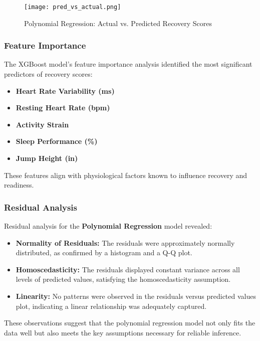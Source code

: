 \documentclass[manuscript,acmsmall,review,screen,authorversion=true]{acmart}
\begin{document}
\begin{figure}[h]
\centering
\texttt{[image: pred\_vs\_actual.png]} %
\caption{Polynomial Regression: Actual vs. Predicted Recovery Scores}
\label{fig:pred_vs_actual}
\end{figure}

\subsubsection{Feature Importance}

The XGBoost model's feature importance analysis identified the most significant predictors of recovery scores:

\begin{itemize}
    \item \textbf{Heart Rate Variability (ms)}
    \item \textbf{Resting Heart Rate (bpm)}
    \item \textbf{Activity Strain}
    \item \textbf{Sleep Performance (\%)}
    \item \textbf{Jump Height (in)}
\end{itemize}

These features align with physiological factors known to influence recovery and readiness.

\subsubsection{Residual Analysis}

Residual analysis for the \textbf{Polynomial Regression} model revealed:

\begin{itemize}
    \item \textbf{Normality of Residuals:} The residuals were approximately normally distributed, as confirmed by a histogram and a Q-Q plot.

    \item \textbf{Homoscedasticity:} The residuals displayed constant variance across all levels of predicted values, satisfying the homoscedasticity assumption.

    \item \textbf{Linearity:} No patterns were observed in the residuals versus predicted values plot, indicating a linear relationship was adequately captured.
\end{itemize}

These observations suggest that the polynomial regression model not only fits the data well but also meets the key assumptions necessary for reliable inference.
\end{document}
